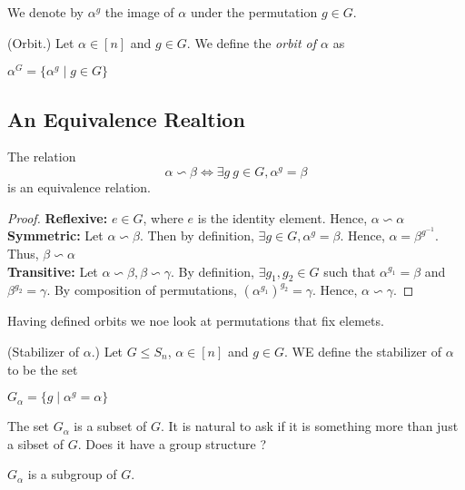 \begin{notation}We denote by $\alpha^g$ the image of $\alpha$ under the permutation $g\in G$. \end{notation}

\begin{definition}(Orbit.) Let $\alpha \in [n]$ and $g \in G$. We define the {\em orbit of $\alpha$} as
\begin{center}
$\alpha^G = \{\alpha^g \mid g \in G\}$
\end{center}
\end{definition}

\subsection{An Equivalence Realtion}

\begin{lemma}
The relation 
\[\alpha \backsim \beta \iff \exists g~ g\in G, \alpha^g = \beta\]
is an equivalence relation.
\end{lemma}
\begin{proof}
\textbf{Reflexive: } $e \in G$, where $e$ is the identity element. Hence, $\alpha \backsim \alpha$ \\
\textbf{Symmetric: } Let $\alpha \backsim \beta$. Then by definition, $\exists g\in G, \alpha^g = \beta$. Hence, $\alpha = \beta^{g^{-1}}$. Thus, $\beta \backsim \alpha$ \\
\textbf{Transitive: } Let $\alpha \backsim \beta, \beta \backsim \gamma$. By definition, $\exists g_1,g_2\in G$ such that $\alpha^{g_1} = \beta$ and  $\beta^{g_2} = \gamma$. By composition of permutations, $(\alpha^{g_1})^{g_2} = \gamma$. Hence, $\alpha \backsim \gamma$.
\end{proof}

Having defined orbits we noe look at permutations that fix elemets.


\begin{definition}(Stabilizer of $\alpha$.)
Let $G\leq S_n$, $\alpha \in [n]$ and $g \in G$. WE define the stabilizer of $\alpha$ to be the set
\begin{center}
$G_{\alpha} = \{g \mid \alpha^g = \alpha\}$
\end{center}
\end{definition}

The set $G_\alpha$ is a subset of $G$. It is natural to ask if it is something more than just a sibset of $G$.
Does it have a group structure ? 

\begin{observation}
$G_{\alpha}$ is a subgroup of $G$.
\end{observation}

